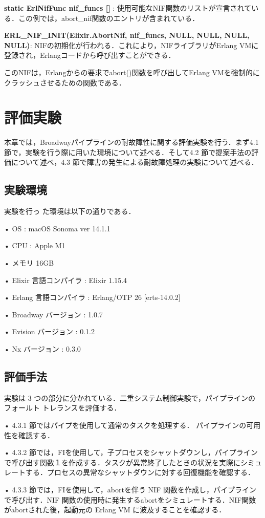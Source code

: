 \documentclass[a4paper]{jreport}	%
\begin{document}
\textbf{static ErlNifFunc nif\_funcs [] }: 使用可能なNIF関数のリストが宣言されている．この例では，abort\_nif関数のエントリが含まれている．

\textbf{ERL\_NIF\_INIT(Elixir.AbortNif, nif\_funcs, NULL, NULL, NULL, NULL)}: NIFの初期化が行われる．これにより，NIFライブラリがErlang VMに登録され，Erlangコードから呼び出すことができる．

このNIFは，Erlangからの要求でabort()関数を呼び出してErlang VMを強制的にクラッシュさせるための関数である．

\chapter{評価実験}
本章では，Broadwayパイプラインの耐故障性に関する評価実験を行う．まず4.1 節で，実験を行う際に用いた環境について述べる．そして4.2 節で提案手法の評価について述べ，4.3 節で障害の発生による耐故障処理の実験について述べる．
\section{実験環境}
実験を行っ た環境は以下の通りである．

• OS : macOS Sonoma ver 14.1.1 

• CPU : Apple M1

• メモリ 16GB 

• Elixir 言語コンパイラ : Elixir 1.15.4

• Erlang 言語コンパイラ : Erlang/OTP 26 [erts-14.0.2]

• Broadway バージョン :  1.0.7

• Evision バージョン :  0.1.2

• Nx バージョン :  0.3.0

\section{評価手法}
実験は 3 つの部分に分かれている．二重システム制御実験で，パイプラインのフォールト トレランスを評価する．

• 4.3.1 節ではパイプを使用して通常のタスクを処理する． パイプラインの可用性を確認する．

• 4.3.2 節では，FIを使用して，子プロセスをシャットダウンし，パイプラインで呼び出す関数１を作成する．タスクが異常終了したときの状況を実際にシミュレートする．プロセスの異常なシャットダウンに対する回復機能を確認する．

• 4.3.3 節では，FIを使用して，abortを伴う NIF 関数を作成し，パイプラインで呼び出す．NIF 関数の使用時に発生するabortをシミュレートする．NIF関数がabortされた後，起動元の Erlang VM に波及することを確認する．
\end{document}
